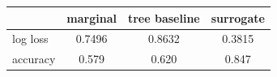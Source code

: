 \begin{tabular}{lccc}
\toprule
 & marginal & tree baseline & surrogate \\
\midrule
log loss & 0.7496 & 0.8632 & 0.3815 \\
accuracy & 0.579 & 0.620 & 0.847 \\
\bottomrule
\end{tabular}

